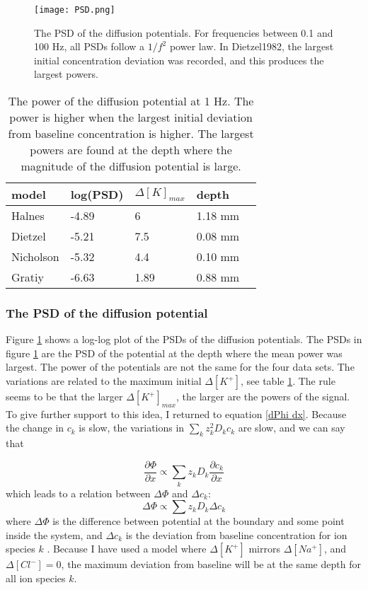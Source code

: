 \documentclass{article}
\begin{document}
\begin{figure}
  \texttt{[image: PSD.png]}
  \caption{The PSD of the diffusion potentials. For frequencies between 0.1 and 100 Hz, all PSDs follow a $1/f^2$ power law. In Dietzel1982, the largest initial concentration deviation was recorded, and this produces the largest powers.}
  \label{fig:PSD}
\end{figure}




\begin{table}[h!]
  \centering
  \caption{The power of the diffusion potential at 1 Hz. The power is higher when the largest initial deviation from baseline concentration is higher. The largest powers are found at the depth where the magnitude of the diffusion potential is large.}
  \label{tab:psd_magnitude}
  \begin{tabular}{l||l|l|l|l}
model & log(PSD) & $\Delta [K]_{max}$ & depth \\
\hline
Halnes & -4.89 & 6  & 1.18 mm\\
Dietzel & -5.21 & 7.5 & 0.08 mm \\
Nicholson & -5.32 & 4.4 & 0.10 mm \\
Gratiy &-6.63 & 1.89 & 0.88 mm \\
 \end{tabular}
\end{table}





\subsubsection{The PSD of the diffusion potential}
Figure \ref{fig:PSD} shows a log-log plot of the PSDs of the diffusion potentials. The PSDs in figure \ref{fig:PSD} are the PSD of the potential at the depth where the mean power was largest. The power of the potentials are not the same for the four data sets. The variations are related to the maximum initial $\Delta [K^+]$, see table \ref{tab:psd_magnitude}. The rule seems to be that the larger $\Delta [K^+]_{max}$, the larger are the powers of the signal.  To give further support to this idea, I returned to equation \ref{dPhi dx}. Because the change in $c_k$ is slow, the variations in $\sum_k z_k^2 D_k c_k$ are slow, and we can say that 

\begin{equation}
 \frac{\partial \Phi}{\partial x}  \propto { \sum_k z_k D_k \frac{\partial c_k}{\partial x} }
\end{equation}
which leads to a relation between $\Delta \Phi$ and $\Delta c_k$:
\begin{equation}\label{delta phi}
 \Delta \Phi \propto \sum z_k D_k \Delta c_k
\end{equation}
where $\Delta \Phi $ is the difference between potential at the boundary and some point inside the system, and $\Delta c_k $ is the deviation from baseline concentration for ion species $k$ . Because I have used a model where $\Delta [K^+]$ mirrors $\Delta [Na^+]$, and $\Delta [Cl^-] =0$, the maximum deviation from baseline will be at the same depth for all ion species $k$. 
\end{document}
